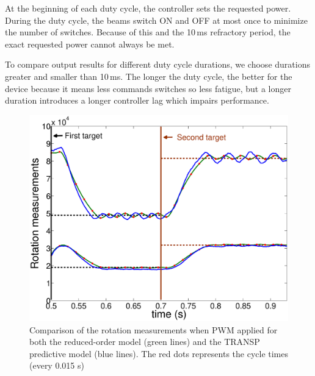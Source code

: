\documentclass[12pt]{iopart}
\begin{document}

At the beginning of each duty cycle, the controller sets the requested power. During the duty cycle, the beams switch ON and OFF at most once to minimize the number of switches. Because of this and the 10\,ms refractory period, the exact requested power cannot always be met.

 
To compare output results for different duty cycle durations, we choose durations greater and smaller than 10\,ms. The longer the duty cycle, the better for the device because it means less commands switches so less fatigue, but a longer duration introduces a longer controller lag which impairs performance.
  
\begin{figure}
\centering
\includegraphics[width=\linewidth]{imene_figs/Goum14l} 
\caption{Comparison of the rotation measurements when PWM applied for both the reduced-order model (green lines) and the TRANSP predictive model (blue lines). The red dots represents the cycle times (every 0.015 s)}
\label{fig:rot14}
\end{figure}
\end{document}
